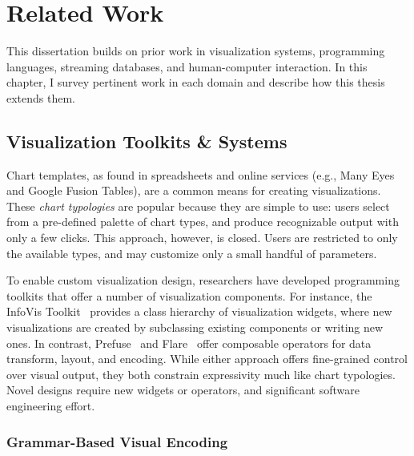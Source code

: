 \chapter{Related Work}
\label{sec:related_work}

This dissertation builds on prior work in visualization systems, programming
languages, streaming databases, and human-computer interaction. In this chapter,
I survey pertinent work in each domain and describe how this thesis extends
them.

\vspace{-10pt}

\section{Visualization Toolkits \& Systems}

\vspace{-10pt}

Chart templates, as found in spreadsheets and online services (e.g., Many
Eyes~\cite{ibm:manyeyes} and Google Fusion Tables), are a common means for
creating visualizations. These \emph{chart typologies} are popular because they
are simple to use: users select from a pre-defined palette of chart types, and
produce recognizable output with only a few clicks. This approach, however, is
closed. Users are restricted to only the available types, and may customize only
a small handful of parameters.

To enable custom visualization design, researchers have developed programming
toolkits that offer a number of visualization components. For instance, the
InfoVis Toolkit~\cite{fekete:ivtk} provides a class hierarchy of visualization
widgets, where new visualizations are created by subclassing existing components
or writing new ones. In contrast, Prefuse~\cite{heer:prefuse} and
Flare~\cite{flare} offer composable operators for data transform, layout, and
encoding. While either approach offers fine-grained control over visual output,
they both constrain expressivity much like chart typologies. Novel designs
require new widgets or operators, and significant software engineering effort.

\subsection{Grammar-Based Visual Encoding}

\vspace{-10pt}

